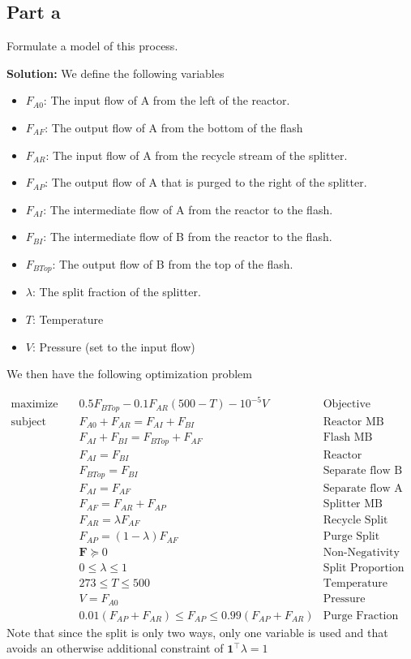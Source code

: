 \documentclass[11pt]{article}
\begin{document}
\subsection{Part a}
Formulate a model of this process.




\textbf{Solution: }
We define the following variables
\begin{itemize}
  \item $F_{A0}$: The input flow of A from the left of the reactor.
  \item $F_{AF}$: The output flow of A from the bottom of the flash 
  \item $F_{AR}$: The input flow of A from the recycle stream of the splitter.
  \item $F_{AP}$: The output flow of A that is purged to the right of the splitter.
  \item $F_{AI}$: The intermediate flow of A from the reactor to the flash.
  \item $F_{BI}$: The intermediate flow of B from the reactor to the flash.
  \item $F_{BTop}$: The output flow of B from the top of the flash.
  \item $\lambda$: The split fraction of the splitter.
  \item $T$: Temperature
  \item $V$: Pressure (set to the input flow)
\end{itemize}

We then have the following optimization problem

\begin{align*}
  \text{maximize} & \quad 0.5 F_{BTop} - 0.1F_{AR}(500-T) - 10^{-5} V & \text{Objective}\\
  \text{subject to} & \quad F_{A0} + F_{AR} = F_{AI} + F_{BI} & \text{Reactor MB}\\
  & \quad F_{AI} + F_{BI} = F_{BTop} + F_{AF} & \text{Flash MB} \\
  & \quad F_{AI} = F_{BI} & \text{Reactor Conversion}\\
  & \quad F_{BTop} = F_{BI} & \text{Separate flow B}\\
  & \quad F_{AI} = F_{AF} & \text{Separate flow A} \\
  & \quad F_{AF} = F_{AR} + F_{AP} & \text{Splitter MB} \\
  & \quad F_{AR} = \lambda F_{AF} & \text{Recycle Split} \\
  & \quad F_{AP} = (1-\lambda) F_{AF} & \text{Purge Split} \\
  & \quad \textbf{F} \succeq 0 & \text{Non-Negativity} \\
  & \quad 0 \leq \lambda \leq 1 & \text{Split Proportion} \\
  & \quad 273 \leq T \leq 500 & \text{Temperature Constraints} \\
  & \quad V = F_{A0} & \text{Pressure Constraint} \\
  & \quad 0.01(F_{AP} + F_{AR}) \leq F_{AP} \leq 0.99(F_{AP} + F_{AR}) & \text{Purge Fraction}
\end{align*}
Note that since the split is only two ways, only one variable is used and that avoids an otherwise additional constraint of $\textbf{1}^\top \lambda = 1$
\end{document}
